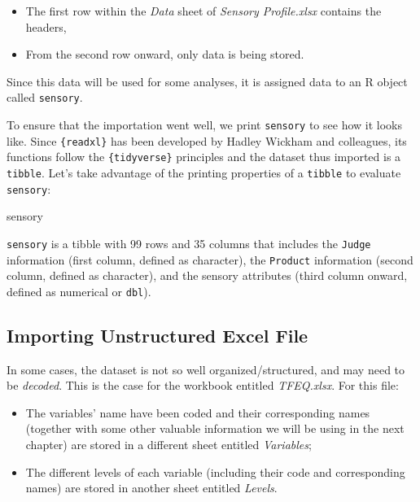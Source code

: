 \documentclass[
]{book}
\newenvironment{Shaded}{\begin{snugshade}}{\end{snugshade}}
\newcommand{\NormalTok}[1]{#1}
\providecommand{\tightlist}{%
  \setlength{\itemsep}{0pt}\setlength{\parskip}{0pt}}
\begin{document}
\begin{itemize}
\tightlist
\item
  The first row within the \emph{Data} sheet of \emph{Sensory Profile.xlsx} contains the headers,\\
\item
  From the second row onward, only data is being stored.
\end{itemize}

Since this data will be used for some analyses, it is assigned data to an R object called \texttt{sensory}.

To ensure that the importation went well, we print \texttt{sensory} to see how it looks like. Since \texttt{\{readxl\}} has been developed by Hadley Wickham and colleagues, its functions follow the \texttt{\{tidyverse\}} principles and the dataset thus imported is a \texttt{tibble}. Let's take advantage of the printing properties of a \texttt{tibble} to evaluate \texttt{sensory}:

\begin{Shaded}
\begin{Highlighting}[]
\NormalTok{sensory}
\end{Highlighting}
\end{Shaded}

\texttt{sensory} is a tibble with 99 rows and 35 columns that includes the \texttt{Judge} information (first column, defined as character), the \texttt{Product} information (second column, defined as character), and the sensory attributes (third column onward, defined as numerical or \texttt{dbl}).

\hypertarget{importing-unstructured-excel-file}{%
\subsection{Importing Unstructured Excel File}\label{importing-unstructured-excel-file}}

In some cases, the dataset is not so well organized/structured, and may need to be \emph{decoded}. This is the case for the workbook entitled \emph{TFEQ.xlsx}. For this file:

\begin{itemize}
\tightlist
\item
  The variables' name have been coded and their corresponding names (together with some other valuable information we will be using in the next chapter) are stored in a different sheet entitled \emph{Variables};
\item
  The different levels of each variable (including their code and corresponding names) are stored in another sheet entitled \emph{Levels}.
\end{itemize}
\end{document}
